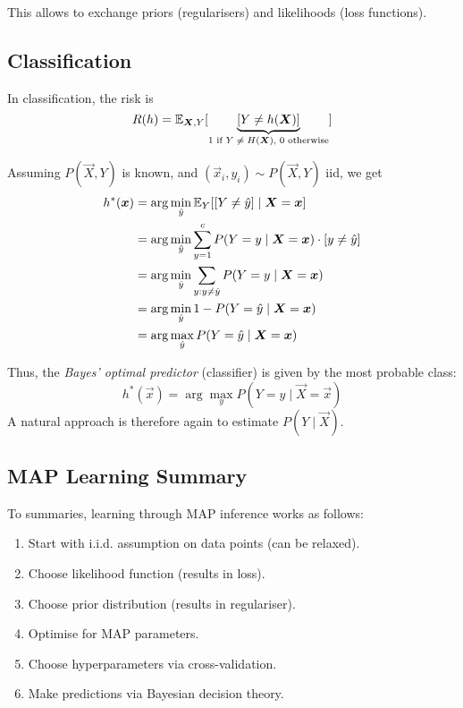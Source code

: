 This allows to exchange priors (regularisers)
and likelihoods (loss functions).


\subsection{Classification}
In classification, the risk is
\begin{equation*}
    R(h) = \mathbb{E}_{\boldsymbol{X}, Y}[
        \underbrace{[Y \neq h(\boldsymbol{X})]}_\text{$1$ if $Y \neq H(\boldsymbol{X})$, $0$ otherwise}
    ]
\end{equation*}

Assuming $P(\vec{X}, Y)$ is known,
and $(\vec{x}_i, y_i) \sim P(\vec{X}, Y)$ iid,
we get
\begin{align*}
    h^*(\boldsymbol{x}) &= \arg\min_{\hat{y}}{
        \mathbb{E}_Y[[Y \neq \hat{y}] \mid \boldsymbol{X} = \boldsymbol{x}]
    } \\
    &= \arg\min_{\hat{y}}{
        \sum_{y=1}^c{P(Y = y \mid \boldsymbol{X} = \boldsymbol{x}) \cdot [y \neq \hat{y}] }
    } \\
    &= \arg\min_{\hat{y}}{
        \sum_{y : y \neq \hat{y}}{P(Y = y \mid \boldsymbol{X} = \boldsymbol{x})}    
    } \\
    &= \arg\min_{\hat{y}}{1 - P(Y = \hat{y} \mid \boldsymbol{X} = \boldsymbol{x})} \\
    &= \arg\max_{\hat{y}}{P(Y = \hat{y} \mid \boldsymbol{X} = \boldsymbol{x})}
\end{align*}

Thus, the \emph{Bayes' optimal predictor} (classifier)
is given by the most probable class:
\begin{equation*}
    h^*(\vec{x}) = \arg\max_y{P(Y = y \mid \vec{X} = \vec{x})}
\end{equation*}
A natural approach is therefore again to estimate $P(Y \mid \vec{X})$.


\subsection{MAP Learning Summary}
To summaries, learning through MAP inference
works as follows:
\begin{enumerate}
    \item Start with i.i.d. assumption
    on data points (can be relaxed).
    \item Choose likelihood function
    (results in loss).
    \item Choose prior distribution
    (results in regulariser).
    \item Optimise for MAP parameters.
    \item Choose hyperparameters
    via cross-validation.
    \item Make predictions via Bayesian
    decision theory.
\end{enumerate}
